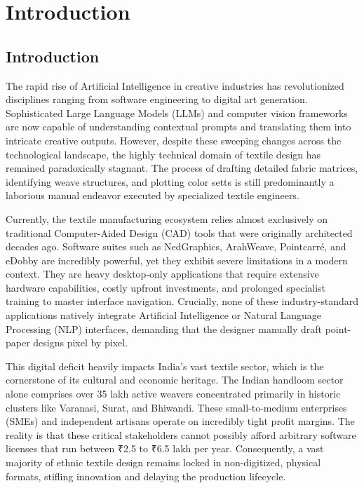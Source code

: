\chapter{Introduction}

\section{Introduction}
The rapid rise of Artificial Intelligence in creative industries has revolutionized disciplines ranging from software engineering to digital art generation. Sophisticated Large Language Models (LLMs) and computer vision frameworks are now capable of understanding contextual prompts and translating them into intricate creative outputs. However, despite these sweeping changes across the technological landscape, the highly technical domain of textile design has remained paradoxically stagnant. The process of drafting detailed fabric matrices, identifying weave structures, and plotting color setts is still predominantly a laborious manual endeavor executed by specialized textile engineers.

Currently, the textile manufacturing ecosystem relies almost exclusively on traditional Computer-Aided Design (CAD) tools that were originally architected decades ago. Software suites such as NedGraphics, ArahWeave, Pointcarré, and eDobby are incredibly powerful, yet they exhibit severe limitations in a modern context. They are heavy desktop-only applications that require extensive hardware capabilities, costly upfront investments, and prolonged specialist training to master interface navigation. Crucially, none of these industry-standard applications natively integrate Artificial Intelligence or Natural Language Processing (NLP) interfaces, demanding that the designer manually draft point-paper designs pixel by pixel.

This digital deficit heavily impacts India's vast textile sector, which is the cornerstone of its cultural and economic heritage. The Indian handloom sector alone comprises over 35 lakh active weavers concentrated primarily in historic clusters like Varanasi, Surat, and Bhiwandi. These small-to-medium enterprises (SMEs) and independent artisans operate on incredibly tight profit margins. The reality is that these critical stakeholders cannot possibly afford arbitrary software licenses that run between ₹2.5 to ₹6.5 lakh per year. Consequently, a vast majority of ethnic textile design remains locked in non-digitized, physical formats, stifling innovation and delaying the production lifecycle.

